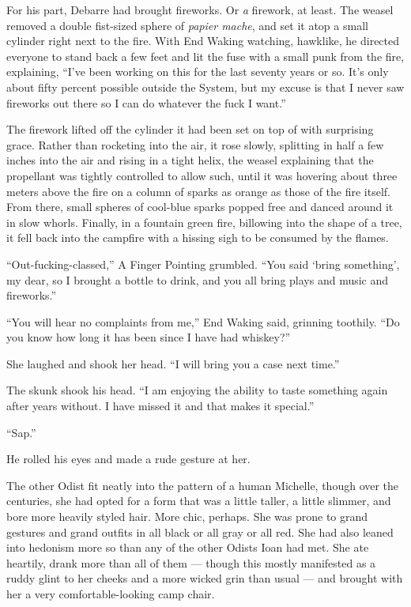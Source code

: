 For his part, Debarre had brought fireworks. Or \emph{a} firework, at least. The weasel removed a double fist-sized sphere of \emph{papier mache}, and set it atop a small cylinder right next to the fire. With End Waking watching, hawklike, he directed everyone to stand back a few feet and lit the fuse with a small punk from the fire, explaining, ``I've been working on this for the last seventy years or so. It's only about fifty percent possible outside the System, but my excuse is that I never saw fireworks out there so I can do whatever the fuck I want.''

The firework lifted off the cylinder it had been set on top of with surprising grace. Rather than rocketing into the air, it rose slowly, splitting in half a few inches into the air and rising in a tight helix, the weasel explaining that the propellant was tightly controlled to allow such, until it was hovering about three meters above the fire on a column of sparks as orange as those of the fire itself. From there, small spheres of cool-blue sparks popped free and danced around it in slow whorls. Finally, in a fountain green fire, billowing into the shape of a tree, it fell back into the campfire with a hissing sigh to be consumed by the flames.

``Out-fucking-classed,'' A Finger Pointing grumbled. ``You said `bring something', my dear, so I brought a bottle to drink, and you all bring plays and music and fireworks.''

``You will hear no complaints from me,'' End Waking said, grinning toothily. ``Do you know how long it has been since I have had whiskey?''

She laughed and shook her head. ``I will bring you a case next time.''

The skunk shook his head. ``I am enjoying the ability to taste something again after years without. I have missed it and that makes it special.''

``Sap.''

He rolled his eyes and made a rude gesture at her.

The other Odist fit neatly into the pattern of a human Michelle, though over the centuries, she had opted for a form that was a little taller, a little slimmer, and bore more heavily styled hair. More chic, perhaps. She was prone to grand gestures and grand outfits in all black or all gray or all red. She had also leaned into hedonism more so than any of the other Odists Ioan had met. She ate heartily, drank more than all of them — though this mostly manifested as a ruddy glint to her cheeks and a more wicked grin than usual — and brought with her a very comfortable-looking camp chair.

